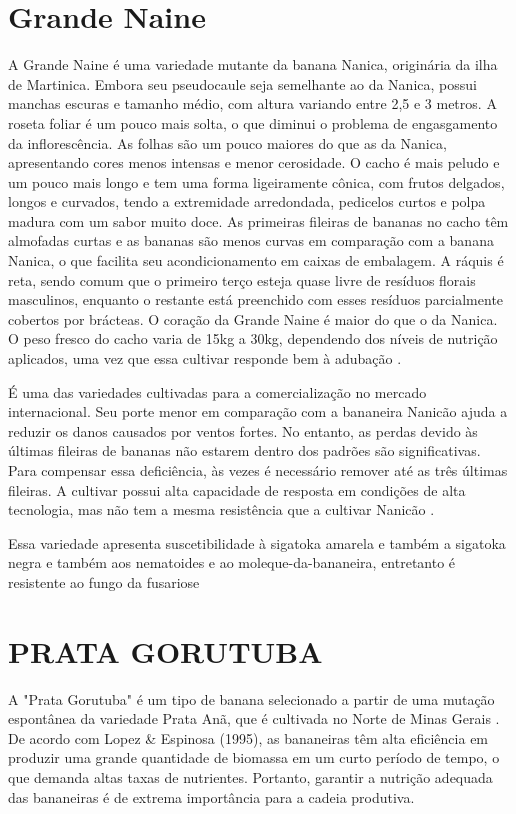 \section{Grande Naine}
A Grande Naine é uma variedade mutante da banana Nanica, originária da ilha de Martinica. Embora seu pseudocaule seja semelhante ao da Nanica, possui manchas escuras e tamanho médio, com altura variando entre 2,5 e 3 metros. A roseta foliar é um pouco mais solta, o que diminui o problema de engasgamento da inflorescência. As folhas são um pouco maiores do que as da Nanica, apresentando cores menos intensas e menor cerosidade. O cacho é mais peludo e um pouco mais longo e tem uma forma ligeiramente cônica, com frutos delgados, longos e curvados, tendo a extremidade arredondada, pedicelos curtos e polpa madura com um sabor muito doce. As primeiras fileiras de bananas no cacho têm almofadas curtas e as bananas são menos curvas em comparação com a banana Nanica, o que facilita seu acondicionamento em caixas de embalagem. A ráquis é reta, sendo comum que o primeiro terço esteja quase livre de resíduos florais masculinos, enquanto o restante está preenchido com esses resíduos parcialmente cobertos por brácteas. O coração da Grande Naine é maior do que o da Nanica. O peso fresco do cacho varia de 15kg a 30kg, dependendo dos níveis de nutrição aplicados, uma vez que essa cultivar responde bem à adubação \cite{cultivodebananeira}.

É uma das variedades cultivadas para a comercialização no mercado internacional. Seu porte menor em comparação com a bananeira Nanicão ajuda a reduzir os danos causados por ventos fortes. No entanto, as perdas devido às últimas fileiras de bananas não estarem dentro dos padrões são significativas. Para compensar essa deficiência, às vezes é necessário remover até as três últimas fileiras. A cultivar possui alta capacidade de resposta em condições de alta tecnologia, mas não tem a mesma resistência que a cultivar Nanicão \cite{cultivodebananeira}.

Essa variedade apresenta suscetibilidade à sigatoka amarela \cite {rocha2008epidemiologia, cultivodebananeira} e também a sigatoka negra e também aos nematoides e ao moleque-da-bananeira, entretanto é resistente ao fungo da fusariose \cite{cultivodebananeira}

\section{PRATA GORUTUBA}
A "Prata Gorutuba" é um tipo de banana selecionado a partir de uma mutação espontânea da variedade Prata Anã, que é cultivada no Norte de Minas Gerais \cite{pratagorutuba1}. De acordo com Lopez \& Espinosa (1995), as bananeiras têm alta eficiência em produzir uma grande quantidade de biomassa em um curto período de tempo, o que demanda altas taxas de nutrientes. Portanto, garantir a nutrição adequada das bananeiras é de extrema importância para a cadeia produtiva.

